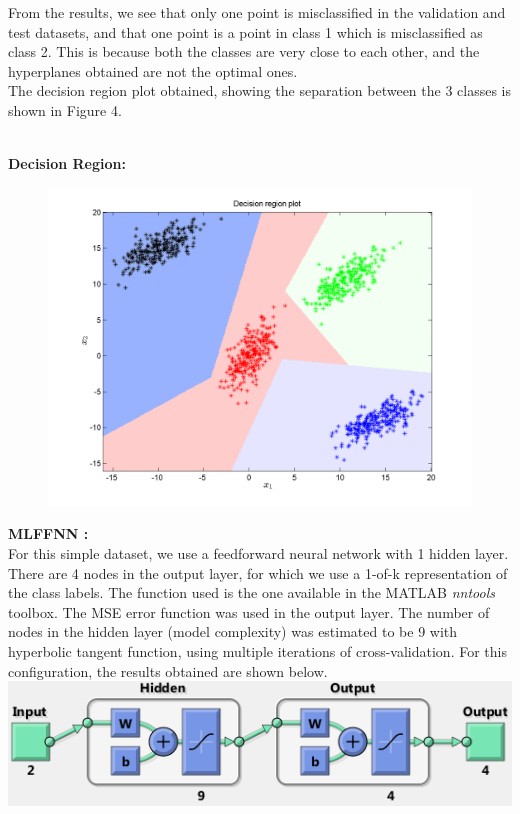 \documentclass{article}
\begin{document}
\begin{flushleft}
From the results, we see that only one point is misclassified in the validation and test datasets, and that one point is a point in class 1 which is misclassified as class 2. This is because both the classes are very close to each other, and the hyperplanes obtained are not the optimal ones. \\[10pt]

The decision region plot obtained, showing the separation between the 3 classes is shown in Figure 4.
\newpage 

\textbf{\\[10pt]Decision Region:\\[5pt]}

\begin{figure}[H]
\centering
\includegraphics[width=\linewidth]{Classification/linearlySeparable/decn_region_perceptron.png}
\caption{}
\end{figure}
\newpage
\textbf{MLFFNN :} \\[10pt]

For this simple dataset, we use a feedforward neural network with 1 hidden layer. There are 4 nodes in the output layer, for which we use a 1-of-k representation of the class labels. The function used is the one available in the MATLAB \textit{nntools} toolbox. The MSE error function was used in the output layer.
The number of nodes in the hidden layer (model complexity) was estimated to be 9 with hyperbolic tangent function, using multiple iterations of cross-validation. For this configuration, the results obtained are shown below.
\\[5pt]
\includegraphics[scale=0.6]{Classification/linearlySeparable/net_config}
	

\end{flushleft}
\end{document}
